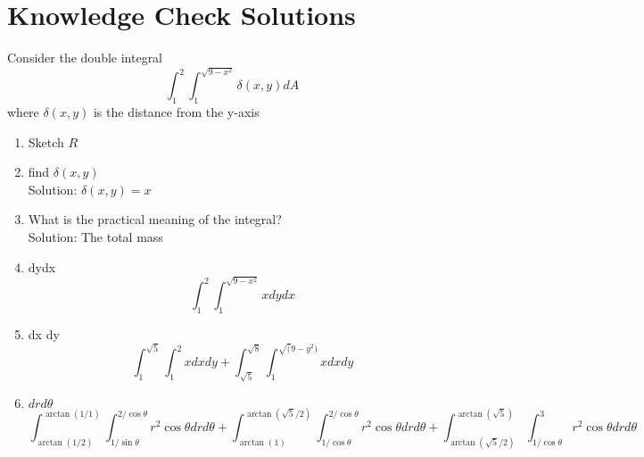 \documentclass[11pt]{article}
\begin{document}
\section{Knowledge Check Solutions}
Consider the double integral
\[\int_{1}^{2} \int_{1}^{\sqrt{9-x^{2}}} \delta(x,y) dA\]
where $\delta(x,y)$ is the distance from the y-axis
\begin{enumerate}
  \item Sketch $R$ \\
  \item find $\delta(x,y)$ \\
        Solution: $\delta(x,y) = x$
  \item What is the practical meaning of the integral?\\
        Solution: The total mass
  \item dydx
        \[\int_{1}^{2}\int_{1}^{\sqrt{9-x^{2}}} x dy dx\]
  \item dx dy
    \[\int_{1}^{\sqrt{5}} \int_{1}^{2} x dx dy + \int_{\sqrt{5}}^{\sqrt{8}} \int_{1}^{\sqrt(9-y^{2})} x dx dy \]
  \item $dr d\theta$
        \[\int_{\arctan(1/2)}^{\arctan(1/1)} \int_{1/\sin\theta}^{2/\cos\theta} r^{2}\cos\theta dr d\theta + \int_{\arctan(1)}^{\arctan(\sqrt{5}/2)} \int_{1/\cos\theta}^{2/\cos\theta} r^{2}\cos\theta dr d\theta
        + \int_{\arctan(\sqrt{5}/2)}^{\arctan(\sqrt{5})} \int_{1/\cos\theta}^{3} r^{2}\cos\theta drd\theta\]


\end{enumerate}
\end{document}
